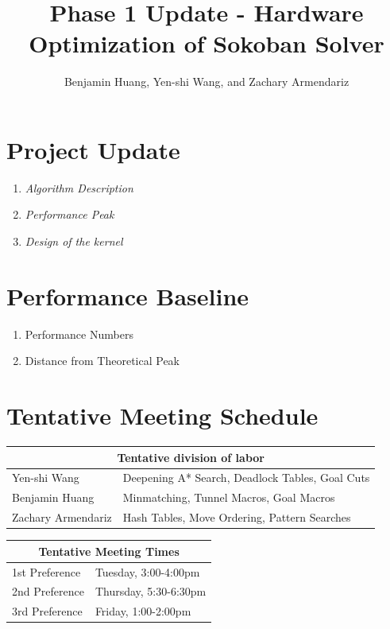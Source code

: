 \documentclass[10pt, notitlepage]{article}
\title{Phase 1 Update - \textbf{Hardware Optimization of Sokoban Solver}}
\author{Benjamin Huang, Yen-shi Wang, and Zachary Armendariz}
\date{}
\begin{document}
\maketitle

\vspace*{-55pt}

\section{Project Update}
\begin{enumerate}
  \item \textit{Algorithm Description}
  \item \textit{Performance Peak}
  \item \textit{Design of the kernel}
\end{enumerate}

\section{Performance Baseline}
\begin{enumerate}
  \item Performance Numbers
  \item Distance from Theoretical Peak
\end{enumerate}
\section{Tentative Meeting Schedule}

\begin{table}[!htb]
    \begin{minipage}{.6\linewidth}
      \centering
        \begin{tabular}{|l|l|}
            \hline
            \multicolumn{2}{|c|}{Tentative division of labor} \\
            \hline\hline
            Yen-shi Wang              &Deepening A* Search, Deadlock Tables, Goal Cuts\\
            Benjamin Huang            & Minmatching, Tunnel Macros, Goal Macros\\
            Zachary Armendariz \quad  & Hash Tables, Move Ordering, Pattern Searches \\
            \hline
        \end{tabular}
    \end{minipage}%
    \begin{minipage}{.4\linewidth}
        \centering
        \begin{tabular}{|l|l|}
            \hline
            \multicolumn{2}{|c|}{Tentative Meeting Times} \\
            \hline\hline
            1st Preference &Tuesday, 3:00-4:00pm \\
            2nd Preference &Thursday, 5:30-6:30pm \\
            3rd Preference &Friday, 1:00-2:00pm \\
            \hline
        \end{tabular}
    \end{minipage} 
\end{table}
    
\end{document}
